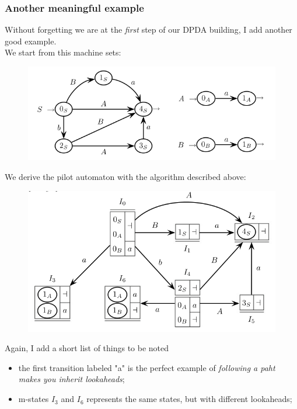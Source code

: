 			\subsubsection{Another meaningful example}
				Without forgetting we are at the \emph{first} step of our DPDA building, I add another good example.\\
				We start from this machine sets:
				\begin{figure}[H]
					\begin{center}
						\includegraphics[width = \textwidth]{./images/ex2.png}
					\end{center}
				\end{figure}
				We derive the pilot automaton with the algorithm described above:
				\begin{figure}[H]
					\begin{center}
						\includegraphics[width = \textwidth]{./images/ex2Pilot.png}
					\end{center}
				\end{figure}
				Again, I add a short list of things to be noted
				\begin{itemize}
					\item the first transition labeled "a" is the perfect example of \emph{following a paht makes you inherit lookaheads};
					\item m-states $I_3$ and $I_6$ represents the same states, but with different lookaheads;
				\end{itemize}
				
